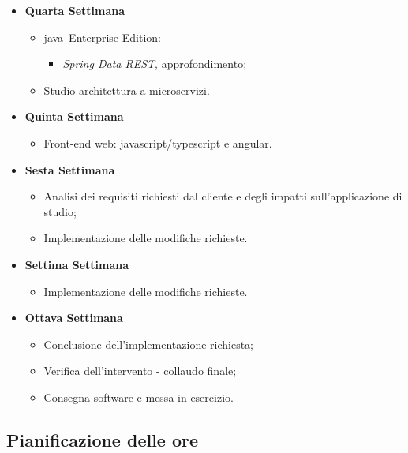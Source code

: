 \begin{itemize}
	\item \textbf{Quarta Settimana}
	\begin{itemize}
		\item \gls{java}\gloss\ Enterprise Edition:
		\begin{itemize}
			\item \textit{Spring Data REST}, approfondimento; %
		\end{itemize}
		\item Studio architettura a microservizi. %
	\end{itemize}

	\clearpage

	\item \textbf{Quinta Settimana}
	\begin{itemize}
		\item Front-end web: \gls{javascript}/\gls{typescript} e \gls{angular}.
	\end{itemize}

	\item \textbf{Sesta Settimana}
	\begin{itemize}
		\item Analisi dei requisiti richiesti dal cliente e degli impatti sull'applicazione di studio;
		\item Implementazione delle modifiche richieste.
	\end{itemize}

	\item \textbf{Settima Settimana}
	\begin{itemize}
		\item Implementazione delle modifiche richieste.
	\end{itemize}

	\item \textbf{Ottava Settimana}
	\begin{itemize}
		\item Conclusione dell'implementazione richiesta;
		\item Verifica dell'intervento - collaudo finale;
		\item Consegna software e messa in esercizio.
	\end{itemize}
\end{itemize}


\clearpage

\subsection{Pianificazione delle ore}

